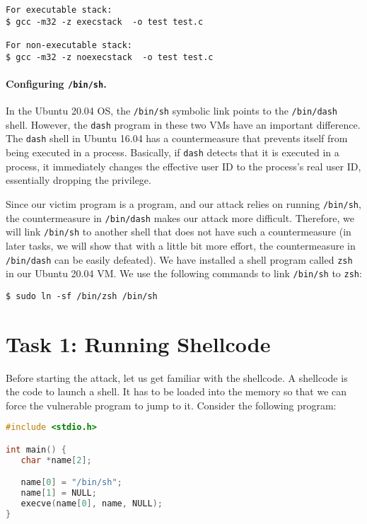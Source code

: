 \begin{lstlisting}
For executable stack:
$ gcc -m32 -z execstack  -o test test.c

For non-executable stack:
$ gcc -m32 -z noexecstack  -o test test.c
\end{lstlisting}



\paragraph{Configuring \texttt{/bin/sh}.} In the Ubuntu 20.04 OS,
the \texttt{/bin/sh} symbolic link points to
the \texttt{/bin/dash} shell. However, the \texttt{dash} program 
in these two VMs have an important difference. 
The \texttt{dash} shell in Ubuntu 16.04 has a countermeasure
that prevents itself from being executed in a \setuid process. 
Basically, if \texttt{dash} detects that it is 
executed in a \setuid process, it immediately 
changes the effective user ID to the process's real user ID, essentially
dropping the privilege. 


Since our victim program is a \setuid program, and our 
attack relies on running \texttt{/bin/sh}, the countermeasure
in \texttt{/bin/dash} makes our attack more difficult. Therefore,
we will link \texttt{/bin/sh} to another shell that does not 
have such a countermeasure (in later tasks, we will show that with
a little bit more effort, the countermeasure in \texttt{/bin/dash}
can be easily defeated). We have installed a shell program 
called \texttt{zsh} in our Ubuntu 20.04 VM. We use the following
commands to link \texttt{/bin/sh} to \texttt{zsh}:

\begin{lstlisting}
$ sudo ln -sf /bin/zsh /bin/sh
\end{lstlisting}


\section{Task 1: Running Shellcode}


Before starting the attack, let us get familiar with the shellcode. A shellcode is the code to
launch a shell. It has to be loaded into the memory so that we can force the
vulnerable program to jump to it. Consider the following program:


\begin{lstlisting}[language=C]
#include <stdio.h>

int main() {
   char *name[2];

   name[0] = "/bin/sh";
   name[1] = NULL;
   execve(name[0], name, NULL);
}
\end{lstlisting}
 

